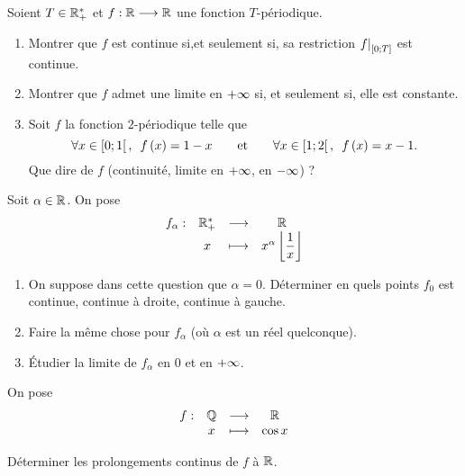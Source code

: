\begin{corr}
\end{corr}

\begin{exo}
Soient \(T\in\mathbb{R}_+^*\) et \(f:\mathbb{R}\longrightarrow\mathbb{R}\) une fonction \(T\)-périodique.

\begin{enumerate}
\item Montrer que \(f\) est continue si,et seulement si, sa restriction \(\restr{f}{\intervii{0}{T}}\) est continue. \\

\item Montrer que \(f\) admet une limite en \(+\infty\) si, et seulement si, elle est constante. \\

\item Soit \(f\) la fonction \(2\)-périodique telle que \[\quantifs{\forall x\in\intervie{0}{1}}f\paren{x}=1-x\qquad\text{et}\qquad\quantifs{\forall x\in\intervie{1}{2}}f\paren{x}=x-1.\] Que dire de \(f\) (continuité, limite en \(+\infty\), en \(-\infty\)) ?
\end{enumerate}
\end{exo}

\begin{corr}
\end{corr}

\begin{exo}
Soit \(\alpha\in\mathbb{R}\). On pose \[\begin{array}[t]{cccc}f_\alpha : & \mathbb{R}_+^* & \longrightarrow & \mathbb{R} \\ & x & \longmapsto & x^\alpha\left\lfloor\dfrac{1}{x}\right\rfloor\end{array}\]

\begin{enumerate}
\item On suppose dans cette question que \(\alpha=0\). Déterminer en quels points \(f_0\) est continue, continue à droite, continue à gauche. \\

\item Faire la même chose pour \(f_\alpha\) (où \(\alpha\) est un réel quelconque). \\

\item Étudier la limite de \(f_\alpha\) en \(0\) et en \(+\infty\).
\end{enumerate}
\end{exo}

\begin{corr}
\end{corr}

\begin{exo}
On pose \[\begin{array}[t]{cccc}f : & \mathbb{Q} & \longrightarrow & \mathbb{R} \\ & x & \longmapsto & \cos x\end{array}\]

Déterminer les prolongements continus de \(f\) à \(\mathbb{R}\).
\end{exo}

